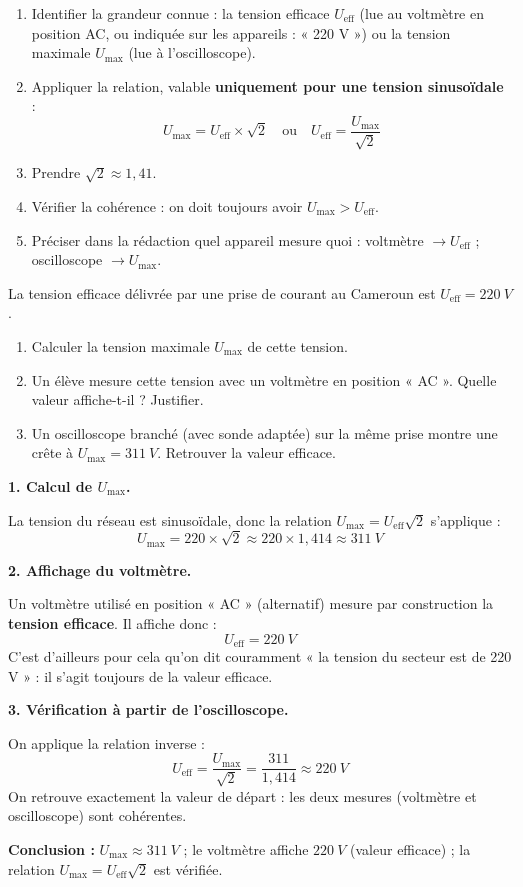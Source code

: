 \documentclass[11pt]{article}
\newcommand{\cle}[1]{{\popxbold\color{popdark}#1}}
\begin{document}
\begin{methode}[Utiliser $U_{\text{max}} = U_{\text{eff}}\sqrt{2}$]
\begin{enumerate}
\item Identifier la grandeur connue : la tension \cle{efficace} $U_{\text{eff}}$ (lue au voltmètre en position AC, ou indiquée sur les appareils : « 220 V ») ou la tension \cle{maximale} $U_{\text{max}}$ (lue à l'oscilloscope).
\item Appliquer la relation, valable \textbf{uniquement pour une tension sinusoïdale} :
\[ U_{\text{max}} = U_{\text{eff}} \times \sqrt{2} \quad \text{ou} \quad U_{\text{eff}} = \dfrac{U_{\text{max}}}{\sqrt{2}} \]
\item Prendre $\sqrt{2} \approx 1,41$.
\item Vérifier la cohérence : on doit toujours avoir $U_{\text{max}} > U_{\text{eff}}$.
\item Préciser dans la rédaction quel appareil mesure quoi : voltmètre $\rightarrow U_{\text{eff}}$ ; oscilloscope $\rightarrow U_{\text{max}}$.
\end{enumerate}
\end{methode}

\begin{exoresolu}
La tension efficace délivrée par une prise de courant au Cameroun est $U_{\text{eff}} = \SI{220}{V}$.
\begin{enumerate}
\item Calculer la tension maximale $U_{\text{max}}$ de cette tension.
\item Un élève mesure cette tension avec un voltmètre en position « AC ». Quelle valeur affiche-t-il ? Justifier.
\item Un oscilloscope branché (avec sonde adaptée) sur la même prise montre une crête à $U_{\text{max}} = \SI{311}{V}$. Retrouver la valeur efficace.
\end{enumerate}
\tcblower
\textbf{1. Calcul de $U_{\text{max}}$.}

La tension du réseau est sinusoïdale, donc la relation $U_{\text{max}} = U_{\text{eff}}\sqrt{2}$ s'applique :
\[ U_{\text{max}} = 220 \times \sqrt{2} \approx 220 \times 1,414 \approx \SI{311}{V} \]

\textbf{2. Affichage du voltmètre.}

Un voltmètre utilisé en position « AC » (alternatif) mesure par construction la \textbf{tension efficace}. Il affiche donc :
\[ U_{\text{eff}} = \SI{220}{V} \]
C'est d'ailleurs pour cela qu'on dit couramment « la tension du secteur est de 220 V » : il s'agit toujours de la valeur efficace.

\textbf{3. Vérification à partir de l'oscilloscope.}

On applique la relation inverse :
\[ U_{\text{eff}} = \dfrac{U_{\text{max}}}{\sqrt{2}} = \dfrac{311}{1,414} \approx \SI{220}{V} \]
On retrouve exactement la valeur de départ : les deux mesures (voltmètre et oscilloscope) sont cohérentes.

\textbf{Conclusion :} $U_{\text{max}} \approx \SI{311}{V}$ ; le voltmètre affiche $\SI{220}{V}$ (valeur efficace) ; la relation $U_{\text{max}} = U_{\text{eff}}\sqrt{2}$ est vérifiée.
\end{exoresolu}
\end{document}

